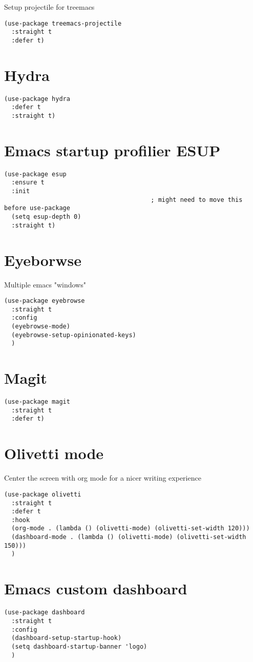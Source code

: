 \documentclass[11pt]{article}
\begin{document}
Setup projectile for treemacs

\begin{verbatim}
(use-package treemacs-projectile
  :straight t
  :defer t)
\end{verbatim}
\section{Hydra}
\label{sec:org6f9722c}
\begin{verbatim}
(use-package hydra
  :defer t
  :straight t)
\end{verbatim}
\section{Emacs startup profilier ESUP}
\label{sec:org64ceeba}
\begin{verbatim}
(use-package esup
  :ensure t
  :init
                                        ; might need to move this before use-package
  (setq esup-depth 0)
  :straight t)
\end{verbatim}
\section{Eyeborwse}
\label{sec:orgab80d35}
Multiple emacs "windows"

\begin{verbatim}
(use-package eyebrowse
  :straight t
  :config
  (eyebrowse-mode)
  (eyebrowse-setup-opinionated-keys)
  )
\end{verbatim}
\section{Magit}
\label{sec:org5f24e69}
\begin{verbatim}
(use-package magit
  :straight t
  :defer t)
\end{verbatim}
\section{Olivetti mode}
\label{sec:org1ab5f04}
Center the screen with org mode for a nicer writing experience
\begin{verbatim}
(use-package olivetti
  :straight t
  :defer t
  :hook
  (org-mode . (lambda () (olivetti-mode) (olivetti-set-width 120)))
  (dashboard-mode . (lambda () (olivetti-mode) (olivetti-set-width 150)))
  )
\end{verbatim}
\section{Emacs custom dashboard}
\label{sec:org2cdfad5}
\begin{verbatim}
(use-package dashboard
  :straight t
  :config
  (dashboard-setup-startup-hook)
  (setq dashboard-startup-banner 'logo)
  )
\end{verbatim}
\end{document}
